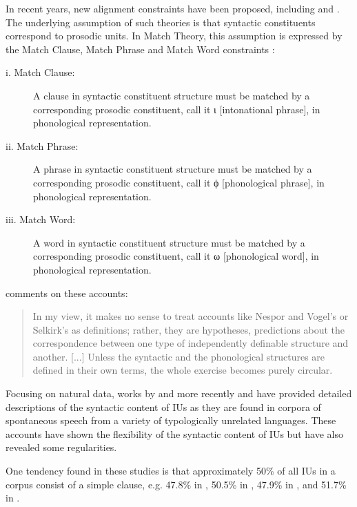 In recent years, new alignment constraints have been proposed, including  \citep{truckenbrodt1999relation} and  \citep{selkirk201114}. The underlying assumption of such theories is that syntactic constituents correspond to prosodic units. In Match Theory, this assumption is expressed by the Match Clause, Match Phrase and Match Word constraints \citep[5]{selkirk201114}:

\begin{description}
	\item [i. Match Clause:] A clause in syntactic constituent structure must be matched by a	corresponding prosodic constituent, call it ι [intonational phrase], in phonological
	representation.
	\item [ii. Match Phrase:] A phrase in syntactic constituent structure must be matched by a	corresponding prosodic constituent, call it ϕ [phonological phrase], in phonological
	representation.
	\item [iii. Match Word:] A word in syntactic constituent structure must be matched by a corresponding prosodic constituent, call it ω [phonological word], in phonological
	representation. 
\end{description}	


\citet[289]{Ladd_2008} comments on these accounts:

\begin{quote}
	In my view, it makes no sense to treat accounts like Nespor and Vogel's or Selkirk's as definitions; rather, they are hypotheses, predictions about the correspondence between one type of independently definable structure and another. [...] Unless the syntactic and the phonological structures are defined in their own terms, the whole exercise becomes purely circular.
\end{quote}


Focusing on natural data, works by  \citet{IwasakiTao1993comparative, Schuetze-Coburn1994, Croft_1995, Tao_1996, Iwasaki1996Thai} and more recently \citet{Croft_2007, Park_2002,  Matsumoto_2003} and  \citet{Wouk_2008} have provided detailed descriptions of the syntactic content of IUs as they are found in corpora of spontaneous speech from a variety of typologically unrelated languages. These accounts have shown the flexibility of the syntactic content of IUs but have also revealed some regularities.




One tendency found in these studies is that approximately 50\% of all IUs in a corpus consist of a simple clause, e.g. 47.8\% in  \citep[849]{Croft_1995}, 50.5\% in  \citep[12]{Croft_2007}, 47.9\% in  \citep[72]{Tao_1996}, and 51.7\% in  \citep[150]{Wouk_2008}. 

